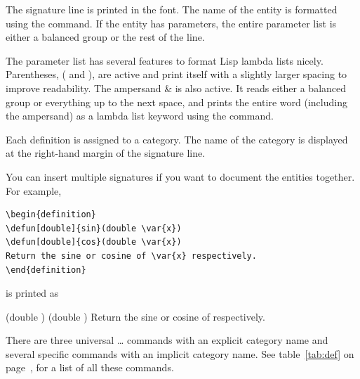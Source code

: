 \documentclass{scrartcl}
\begin{document}
{The signature line is printed in the  font.
The name of the entity is formatted using the  command.
If the entity has parameters, the entire parameter list is either a
balanced group or the rest of the line.

The parameter list has several features to format Lisp lambda lists
nicely.  Parentheses, \code( and \code), are active and print itself
with a slightly larger spacing to improve readability.  The ampersand
\code\& is also active.  It reads either a balanced group or
everything up to the next space, and prints the entire word (including
the ampersand) as a lambda list keyword using the
 command.

Each definition is assigned to a category.  The name of the category is
displayed at the right-hand margin of the signature line.

You can insert multiple signatures if you want to document the
entities together.  For example,
\begin{display}
\begin{verbatim}
\begin{definition}
\defun[double]{sin}(double \var{x})
\defun[double]{cos}(double \var{x})
Return the sine or cosine of \var{x} respectively.
\end{definition}
\end{verbatim}
\end{display}
is printed as
\begin{display}
\begin{definition}
(double )
(double )
Return the sine or cosine of  respectively.
\end{definition}
\end{display}

There are three universal \symb{\def}\ldots{} commands with an
explicit category name and several specific commands with an implicit
category name.  See table~\ref{tab:def} on page~\pageref{tab:def}, for
a list of all these commands.

}
\end{document}
